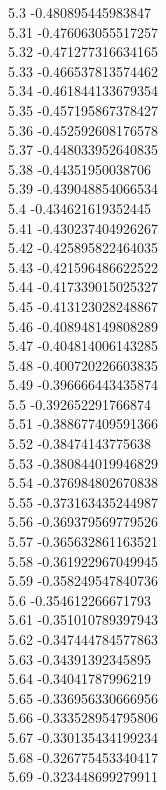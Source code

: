 {5.3	-0.480895445983847\\
5.31	-0.476063055517257\\
5.32	-0.471277316634165\\
5.33	-0.466537813574462\\
5.34	-0.461844133679354\\
5.35	-0.457195867378427\\
5.36	-0.452592608176578\\
5.37	-0.448033952640835\\
5.38	-0.44351950038706\\
5.39	-0.439048854066534\\
5.4	-0.434621619352445\\
5.41	-0.430237404926267\\
5.42	-0.425895822464035\\
5.43	-0.421596486622522\\
5.44	-0.417339015025327\\
5.45	-0.413123028248867\\
5.46	-0.408948149808289\\
5.47	-0.404814006143285\\
5.48	-0.400720226603835\\
5.49	-0.396666443435874\\
5.5	-0.392652291766874\\
5.51	-0.388677409591366\\
5.52	-0.38474143775638\\
5.53	-0.380844019946829\\
5.54	-0.376984802670838\\
5.55	-0.373163435244987\\
5.56	-0.369379569779526\\
5.57	-0.365632861163521\\
5.58	-0.361922967049945\\
5.59	-0.358249547840736\\
5.6	-0.354612266671793\\
5.61	-0.351010789397943\\
5.62	-0.347444784577863\\
5.63	-0.34391392345895\\
5.64	-0.34041787996219\\
5.65	-0.336956330666956\\
5.66	-0.333528954795806\\
5.67	-0.330135434199234\\
5.68	-0.326775453340417\\
5.69	-0.323448699279911\\
}
